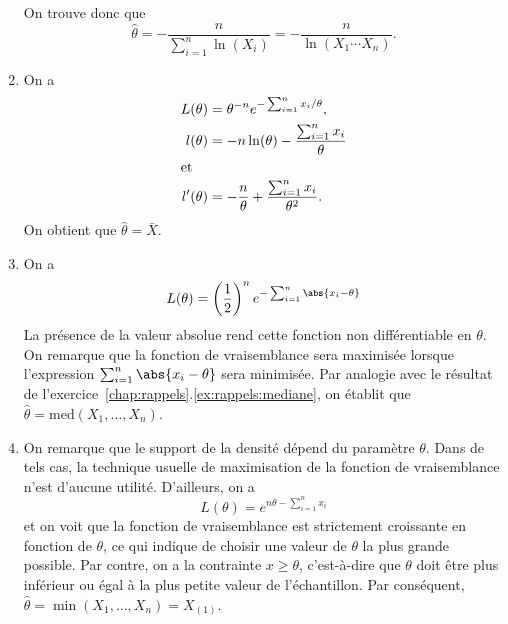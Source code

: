 \begin{exercice}
\begin{sol}
\begin{enumerate}
      On trouve donc que
      \begin{equation*}
      \hat{\theta} = -\frac{n}{\sum_{i=1}^n \ln(X_i)} =
      -\frac{n}{\ln(X_1 \cdots X_n)}.
      \end{equation*}
    \item  On a
      \begin{align*}
        L(\theta) &= \theta^{-n} e^{-\sum_{i=1}^n x_i/\theta}, \\
        l(\theta) &= -n \ln(\theta) - \frac{\sum_{i=1}^n x_i}{\theta} \\
        \intertext{et}
        l^\prime(\theta) &= -\frac{n}{\theta} +
        \frac{\sum_{i=1}^n x_i}{\theta^2}.
      \end{align*}
      On obtient que $\hat{\theta} = \bar{X}$.
    \item On a
      \begin{equation*}
        L(\theta) = \left( \frac{1}{2} \right)^n
        e^{-\sum_{i = 1}^n \abs{x_i - \theta}}
      \end{equation*}
      La présence de la valeur absolue rend cette fonction non
      différentiable en $\theta$. On remarque que la fonction de
      vraisemblance sera maximisée lorsque l'expression $\sum_{i=1}^n
      \abs{x_i - \theta}$ sera minimisée. Par analogie avec le
      résultat de l'exercice~\ref{chap:rappels}.\ref{ex:rappels:mediane},
      on établit que $\hat{\theta} = \text{med}(X_1, \dots, X_n)$.
    \item On remarque que le support de la densité dépend du paramètre
      $\theta$. Dans de tels cas, la technique usuelle de maximisation
      de la fonction de vraisemblance n'est d'aucune utilité.
      D'ailleurs, on a
      \begin{equation*}
        L(\theta) = e^{n\theta - \sum_{i=1}^n x_i}
      \end{equation*}
      et on voit que la fonction de vraisemblance est strictement
      croissante en fonction de $\theta$, ce qui indique de choisir
      une valeur de $\theta$ la plus grande possible. Par contre, on a
      la contrainte $x \geq \theta$, c'est-à-dire que $\theta$ doit
      être plus inférieur ou égal à la plus petite valeur de
      l'échantillon. Par conséquent, $\hat{\theta} = \min(X_1, \dots,
      X_n) = X_{(1)}$.
    \end{enumerate}
  \end{sol}
\end{exercice}

